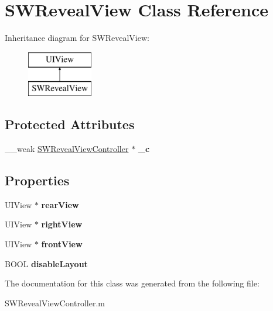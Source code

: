 \hypertarget{interface_s_w_reveal_view}{}\section{S\+W\+Reveal\+View Class Reference}
\label{interface_s_w_reveal_view}
Inheritance diagram for S\+W\+Reveal\+View\+:\begin{figure}[H]
\begin{center}
\leavevmode
\includegraphics[height=2.000000cm]{interface_s_w_reveal_view}
\end{center}
\end{figure}
\subsection*{Protected Attributes}
\begin{DoxyCompactItemize}
\item 
\mbox{\label{interface_s_w_reveal_view_aac58c7eb2115dd4287c6fc783f9ecca8}} 
\+\_\+\+\_\+weak \hyperlink{interface_s_w_reveal_view_controller}{S\+W\+Reveal\+View\+Controller} $\ast$ {\bfseries \+\_\+c}
\end{DoxyCompactItemize}
\subsection*{Properties}
\begin{DoxyCompactItemize}
\item 
\mbox{\label{interface_s_w_reveal_view_a39f98b5e9e7dfb74ec0ab9c2e0e1b65b}} 
U\+I\+View $\ast$ {\bfseries rear\+View}
\item 
\mbox{\label{interface_s_w_reveal_view_ad6d3d7796551504d39ffa19d8be4f07b}} 
U\+I\+View $\ast$ {\bfseries right\+View}
\item 
\mbox{\label{interface_s_w_reveal_view_a94fb4334361038e9c85bd371864283f4}} 
U\+I\+View $\ast$ {\bfseries front\+View}
\item 
\mbox{\label{interface_s_w_reveal_view_aefb91ab8a516144c0693db4298fd30d2}} 
B\+O\+OL {\bfseries disable\+Layout}
\end{DoxyCompactItemize}


The documentation for this class was generated from the following file\+:\begin{DoxyCompactItemize}
\item 
S\+W\+Reveal\+View\+Controller.\+m\end{DoxyCompactItemize}
